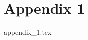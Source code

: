 \documentclass{article} %
\begin{document}

\newpage




\newpage
\appendix %

\hypertarget{appendix1}{%
\section{Appendix 1}\label{appendix1}}
{appendix_1.tex}
\end{document}
